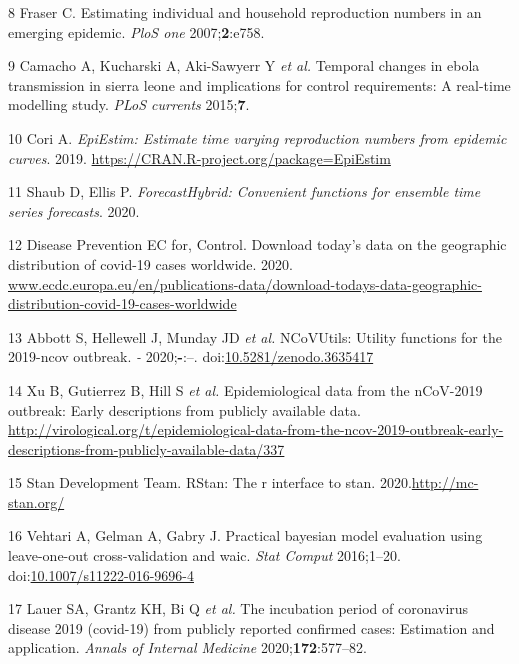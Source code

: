 \documentclass[
]{article}
\begin{document}
\leavevmode\hypertarget{ref-Fraser:2007hf}{}%
8 Fraser C. Estimating individual and household reproduction numbers in
an emerging epidemic. \emph{PloS one} 2007;\textbf{2}:e758.

\leavevmode\hypertarget{ref-Camacho:2015dv}{}%
9 Camacho A, Kucharski A, Aki-Sawyerr Y \emph{et al.} Temporal changes
in ebola transmission in sierra leone and implications for control
requirements: A real-time modelling study. \emph{PLoS currents}
2015;\textbf{7}.

\leavevmode\hypertarget{ref-EpiEstim}{}%
10 Cori A. \emph{EpiEstim: Estimate time varying reproduction numbers
from epidemic curves}. 2019.
\url{https://CRAN.R-project.org/package=EpiEstim}

\leavevmode\hypertarget{ref-forecastHybrid}{}%
11 Shaub D, Ellis P. \emph{ForecastHybrid: Convenient functions for
ensemble time series forecasts}. 2020.

\leavevmode\hypertarget{ref-ecdc_data}{}%
12 Disease Prevention EC for, Control. Download today's data on the
geographic distribution of covid-19 cases worldwide. 2020.
\url{www.ecdc.europa.eu/en/publications-data/download-todays-data-geographic-distribution-covid-19-cases-worldwide}

\leavevmode\hypertarget{ref-NCoVUtils}{}%
13 Abbott S, Hellewell J, Munday JD \emph{et al.} NCoVUtils: Utility
functions for the 2019-ncov outbreak. \emph{-} 2020;\textbf{-}:--.
doi:\href{https://doi.org/10.5281/zenodo.3635417}{10.5281/zenodo.3635417}

\leavevmode\hypertarget{ref-kraemer2020epidemiological}{}%
14 Xu B, Gutierrez B, Hill S \emph{et al.} Epidemiological data from the
nCoV-2019 outbreak: Early descriptions from publicly available data.
\url{http://virological.org/t/epidemiological-data-from-the-ncov-2019-outbreak-early-descriptions-from-publicly-available-data/337}

\leavevmode\hypertarget{ref-rstan}{}%
15 Stan Development Team. RStan: The r interface to stan.
2020.\url{http://mc-stan.org/}

\leavevmode\hypertarget{ref-Vehtari2016}{}%
16 Vehtari A, Gelman A, Gabry J. Practical bayesian model evaluation
using leave-one-out cross-validation and waic. \emph{Stat Comput}
2016;1--20.
doi:\href{https://doi.org/10.1007/s11222-016-9696-4}{10.1007/s11222-016-9696-4}

\leavevmode\hypertarget{ref-incubationperiod}{}%
17 Lauer SA, Grantz KH, Bi Q \emph{et al.} The incubation period of
coronavirus disease 2019 (covid-19) from publicly reported confirmed
cases: Estimation and application. \emph{Annals of Internal Medicine}
2020;\textbf{172}:577--82.
\end{document}
